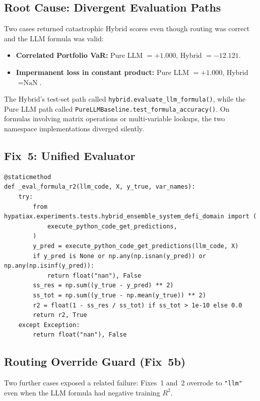 \documentclass[twoside,11pt]{article}
\begin{document}
\subsection{Root Cause: Divergent Evaluation Paths}

Two cases returned catastrophic Hybrid scores even though routing was correct
and the LLM formula was valid:

\begin{itemize}[leftmargin=*]
  \item \textbf{Correlated Portfolio VaR:} Pure LLM $= +1.000$,
    Hybrid $= -12.121$.
  \item \textbf{Impermanent loss in constant product:} Pure LLM $= +1.000$,
    Hybrid $= \text{NaN}$.
\end{itemize}

The Hybrid's test-set path called \texttt{hybrid.evaluate\_llm\_formula()},
while the Pure LLM path called
\texttt{PureLLMBaseline.test\_formula\_accuracy()}.  On formulas involving
matrix operations or multi-variable lookups, the two namespace implementations
diverged silently.

\subsection{Fix~5: Unified Evaluator}

\begin{lstlisting}[caption={Unified formula evaluator (Fix~5).}]
@staticmethod
def _eval_formula_r2(llm_code, X, y_true, var_names):
    try:
        from hypatiax.experiments.tests.hybrid_ensemble_system_defi_domain import (
            execute_python_code_get_predictions,
        )
        y_pred = execute_python_code_get_predictions(llm_code, X)
        if y_pred is None or np.any(np.isnan(y_pred)) or np.any(np.isinf(y_pred)):
            return float("nan"), False
        ss_res = np.sum((y_true - y_pred) ** 2)
        ss_tot = np.sum((y_true - np.mean(y_true)) ** 2)
        r2 = float(1 - ss_res / ss_tot) if ss_tot > 1e-10 else 0.0
        return r2, True
    except Exception:
        return float("nan"), False
\end{lstlisting}

\subsection{Routing Override Guard (Fix~5b)}

Two further cases exposed a related failure: Fixes~1 and~2 overrode to
\texttt{"llm"} even when the LLM formula had negative training $R^2$.
\end{document}
